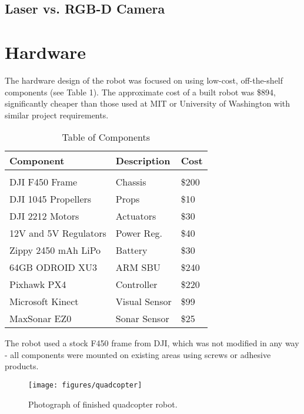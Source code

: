 \documentclass[letterpaper, oneside, 10pt]{report}
\begin{document}
\subsection{Laser vs. RGB-D Camera}

\section{Hardware}

The hardware design of the robot was focused on using low-cost, off-the-shelf components (see Table 1). The approximate cost of a built robot was \$894, significantly cheaper than those used at MIT or University of Washington with similar project requirements.

\begin{table}[h!]
  \centering
  \caption{Table of Components}
  \vspace{2mm}
  \begin{tabular}{l l l}
    \hline \hline
    \vspace{-2mm}
    Component & \multicolumn{1}{l}{Description} & \multicolumn{1}{l}{Cost} \\ [1ex]
    \hline
    & \\
    DJI F450 Frame & Chassis & \$200 \\
    DJI 1045 Propellers & Props & \$10 \\
    DJI 2212 Motors & Actuators & \$30 \\
    12V and 5V Regulators & Power Reg. & \$40 \\
    Zippy 2450 mAh LiPo & Battery & \$30 \\
    64GB ODROID XU3 & ARM SBU & \$240 \\
    Pixhawk PX4 & Controller & \$220 \\
    Microsoft Kinect & Visual Sensor & \$99 \\
    MaxSonar EZ0	& Sonar Sensor & \$25 \\
  \end{tabular}
\end{table}

\noindent The robot used a stock F450 frame from DJI, which was not modified in any way - all components were mounted on existing areas using screws or adhesive products.

\begin{figure}[h!]
 \caption{Photograph of finished quadcopter robot.}
 \centering
   \texttt{[image: figures/quadcopter]}
\end{figure}
\end{document}
